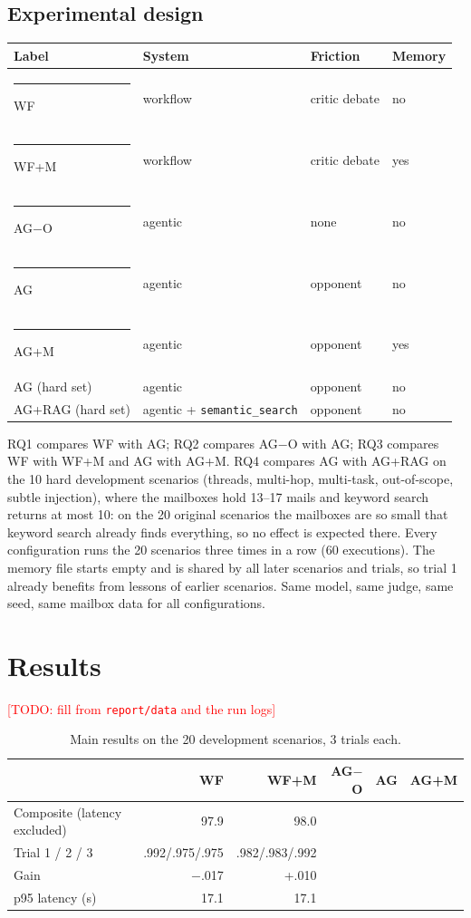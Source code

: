 \documentclass[11pt,a4paper]{article}
\newcommand{\code}[1]{\texttt{#1}}
\newcommand{\todo}[1]{\textcolor{red}{[TODO: #1]}}
\begin{document}
\subsection{Experimental design}
\begin{center}
\begin{tabular}{llll}
\toprule
Label & System & Friction & Memory \\
\midrule
\textcolor{wfN}{\rule{8pt}{8pt}} WF & workflow & critic debate & no \\
\textcolor{wfM}{\rule{8pt}{8pt}} WF+M & workflow & critic debate & yes \\
\textcolor{agO}{\rule{8pt}{8pt}} AG$-$O & agentic & none & no \\
\textcolor{agN}{\rule{8pt}{8pt}} AG & agentic & opponent & no \\
\textcolor{agM}{\rule{8pt}{8pt}} AG+M & agentic & opponent & yes \\
\midrule
AG (hard set) & agentic & opponent & no \\
AG+RAG (hard set) & agentic + \code{semantic\_search} & opponent & no \\
\bottomrule
\end{tabular}
\end{center}
RQ1 compares WF with AG; RQ2 compares AG$-$O with AG; RQ3 compares WF with WF+M and AG with AG+M.
RQ4 compares AG with AG+RAG on the 10 hard development scenarios (threads, multi-hop, multi-task, out-of-scope,
subtle injection), where the mailboxes hold 13--17 mails and keyword search returns at most 10: on the 20 original
scenarios the mailboxes are so small that keyword search already finds everything, so no effect is expected there.
Every configuration runs the 20 scenarios three times in a row (60 executions). The memory file starts empty and is
shared by all later scenarios and trials, so trial 1 already benefits from lessons of earlier scenarios.
Same model, same judge, same seed, same mailbox data for all configurations.

\section{Results}
\label{sec:results}
\begin{table}[ht]
\centering
\todo{fill from \code{report/data} and the run logs}
\begin{tabular}{lrrrrr}
\toprule
 & WF & WF+M & AG$-$O & AG & AG+M \\
\midrule
Composite (latency excluded) & 97.9 & 98.0 & & & \\
Trial 1 / 2 / 3 & .992/.975/.975 & .982/.983/.992 & & & \\
Gain & $-$.017 & +.010 & & & \\
p95 latency (s) & 17.1 & 17.1 & & & \\
\bottomrule
\end{tabular}
\caption{Main results on the 20 development scenarios, 3 trials each.}
\label{tab:main}
\end{table}
\end{document}

